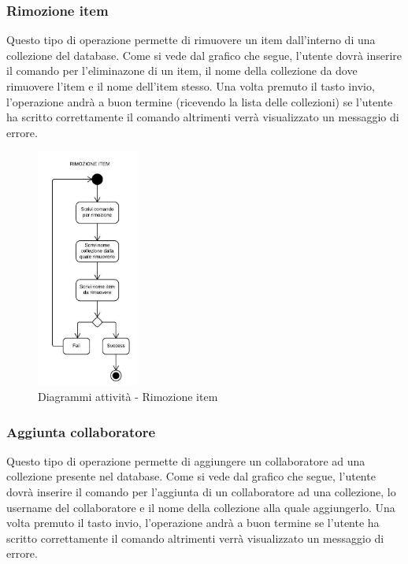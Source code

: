 \documentclass{scalatekids-article}
\begin{document}
\subsubsection{Rimozione item}
Questo tipo di operazione permette di rimuovere un item dall'interno di una collezione del database.
Come si vede dal grafico che segue, l'utente dovrà inserire il comando per l'eliminazone di un item, il nome della collezione da dove rimuovere l'item e il nome dell'item stesso.
Una volta premuto il tasto invio, l'operazione andrà a buon termine (ricevendo la lista delle collezioni) se l'utente ha scritto correttamente il comando altrimenti verrà visualizzato un messaggio di errore.

\begin{figure}[H]
	\begin{center}
		\includegraphics[width=0.3\textwidth, keepaspectratio]{img/diagrammiAttivita/rimozioneItem.jpeg}
		\caption{Diagrammi attività - Rimozione item}
	\end{center}
\end{figure}

\subsubsection{Aggiunta collaboratore}
Questo tipo di operazione permette di aggiungere un collaboratore ad una collezione presente nel database.
Come si vede dal grafico che segue, l'utente dovrà inserire il comando per l'aggiunta di un collaboratore ad una collezione, lo username del collaboratore e il nome della collezione alla quale aggiungerlo.
Una volta premuto il tasto invio, l'operazione andrà a buon termine se l'utente ha scritto correttamente il comando altrimenti verrà visualizzato un messaggio di errore.
\end{document}
